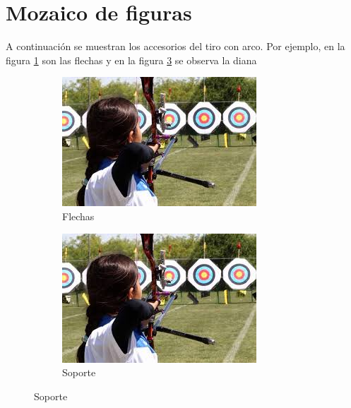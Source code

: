 \documentclass[12pt, legalpaper]{article}
\begin{document}
\section{Mozaico de figuras}

A continuación se muestran los accesorios del tiro con arco. Por ejemplo, en la figura \ref{a} son las flechas y en la figura \ref{b} se observa la diana

\begin{figure}[H] %
    \begin{subfigure}{0.45\textwidth}
        \centering
        \includegraphics[scale=.35, angle=0]{tiro_arco.jpg} 
        \caption{Flechas}
        \label{a}
    \end{subfigure}
    \begin{subfigure}{0.45\textwidth}
        \centering
        \includegraphics[scale=.35, angle=0]{tiro_arco.jpg}
        \caption{Soporte}
        \label{b}
    \end{subfigure} 
    

\end{figure}
\end{document}
